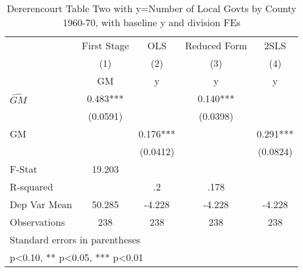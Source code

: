 \begin{table}[htbp]\centering
\def\sym#1{\ifmmode^{#1}\else\(^{#1}\)\fi}
\caption{Dererencourt Table Two with y=Number of Local Govts by County 1960-70, with baseline y and division FEs}
\begin{tabular}{l*{4}{c}}
\toprule
                    & First Stage   &         OLS   &Reduced Form   &        2SLS   \\
                    &\multicolumn{1}{c}{(1)}&\multicolumn{1}{c}{(2)}&\multicolumn{1}{c}{(3)}&\multicolumn{1}{c}{(4)}\\
                    &\multicolumn{1}{c}{GM}&\multicolumn{1}{c}{y}&\multicolumn{1}{c}{y}&\multicolumn{1}{c}{y}\\
\midrule
$\hat{GM}$          &       0.483***&               &       0.140***&               \\
                    &    (0.0591)   &               &    (0.0398)   &               \\
\addlinespace
GM                  &               &       0.176***&               &       0.291***\\
                    &               &    (0.0412)   &               &    (0.0824)   \\
\midrule
F-Stat              &      19.203   &               &               &               \\
R-squared           &               &          .2   &        .178   &               \\
Dep Var Mean        &      50.285   &      -4.228   &      -4.228   &      -4.228   \\
Observations        &         238   &         238   &         238   &         238   \\
\bottomrule
\multicolumn{5}{l}{\footnotesize Standard errors in parentheses}\\
\multicolumn{5}{l}{\footnotesize * p<0.10, ** p<0.05, *** p<0.01}\\
\end{tabular}
\end{table}
